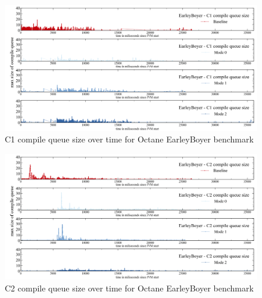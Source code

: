 \begin{figure}[ht]
  \begin{center}
    \centering
    \includegraphics[width=1.0\textwidth]{figures/octane_queue_earleyboyer_separate_c1.png}
    \caption{C1 compile queue size over time for Octane EarleyBoyer benchmark}
    \label{f:octane_queue_earleyboyer_separate_c1}
  \end{center}
\end{figure}
\begin{figure}[ht]
  \begin{center}
    \centering
    \includegraphics[width=1.0\textwidth]{figures/octane_queue_earleyboyer_separate_c2.png}
    \caption{C2 compile queue size over time for Octane EarleyBoyer benchmark}
    \label{f:octane_queue_earleyboyer_separate_c2}
  \end{center}
\end{figure}
